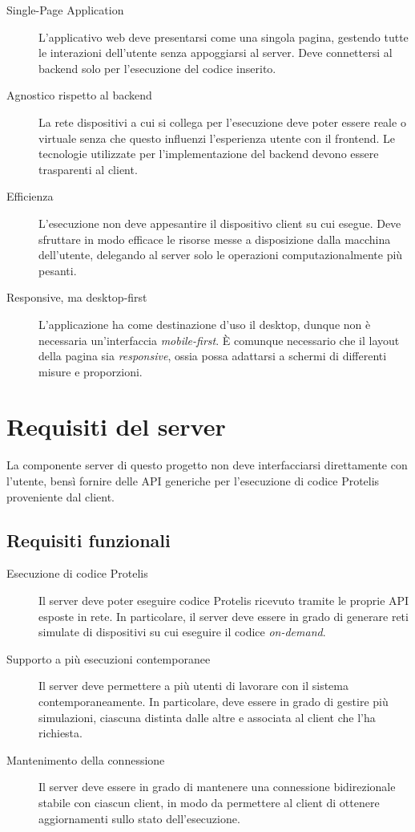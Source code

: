       \begin{description}
        \item[Single-Page Application]
          L'applicativo web deve presentarsi come una singola pagina, gestendo tutte le interazioni dell'utente senza appoggiarsi al server.
          Deve connettersi al backend solo per l'esecuzione del codice inserito.
        \item[Agnostico rispetto al backend]
          La rete dispositivi a cui si collega per l'esecuzione deve poter essere reale o virtuale senza che questo influenzi l'esperienza utente con il frontend.
          Le tecnologie utilizzate per l'implementazione del backend devono essere trasparenti al client.
        \item[Efficienza]
          L'esecuzione non deve appesantire il dispositivo client su cui esegue.
          Deve sfruttare in modo efficace le risorse messe a disposizione dalla macchina dell'utente, delegando al server solo le operazioni computazionalmente più pesanti.
        \item[Responsive, ma desktop-first]
          L'applicazione ha come destinazione d'uso il desktop, dunque non è necessaria un'interfaccia \emph{mobile-first}.
          È comunque necessario che il layout della pagina sia \emph{responsive}, ossia possa adattarsi a schermi di differenti misure e proporzioni.
      \end{description}

  \section{Requisiti del server}
    La componente server di questo progetto non deve interfacciarsi direttamente con l'utente, bensì fornire delle API generiche per l'esecuzione di codice Protelis proveniente dal client.

    \subsection{Requisiti funzionali}

    \begin{description}
      \item[Esecuzione di codice Protelis]
        Il server deve poter eseguire codice Protelis ricevuto tramite le proprie API esposte in rete.
        In particolare, il server deve essere in grado di generare reti simulate di dispositivi su cui eseguire il codice \emph{on-demand}.
      \item[Supporto a più esecuzioni contemporanee]
        Il server deve permettere a più utenti di lavorare con il sistema contemporaneamente.
        In particolare, deve essere in grado di gestire più simulazioni, ciascuna distinta dalle altre e associata al client che l'ha richiesta.
      \item[Mantenimento della connessione]
        Il server deve essere in grado di mantenere una connessione bidirezionale stabile con ciascun client, in modo da permettere al client di ottenere aggiornamenti sullo stato dell'esecuzione.
    \end{description}

